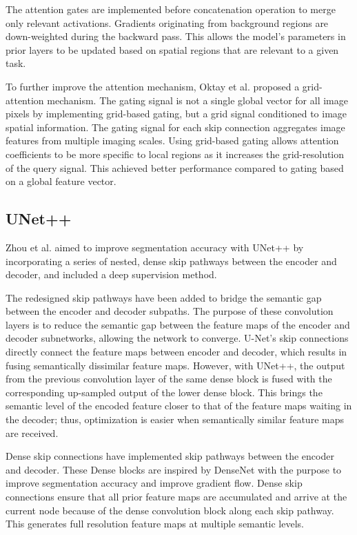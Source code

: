 \documentclass[conference]{IEEEtran}
\begin{document}
The attention gates are implemented before concatenation operation to merge only relevant activations. Gradients originating from background regions are down-weighted during the backward pass. This allows the model's parameters in prior layers to be updated based on spatial regions that are relevant to a given task.

To further improve the attention mechanism, Oktay et al. proposed a grid-attention mechanism. The gating signal is not a single global vector for all image pixels by implementing grid-based gating, but a grid signal conditioned to image spatial information. The gating signal for each skip connection aggregates image features from multiple imaging scales. Using grid-based gating allows attention coefficients to be more specific to local regions as it increases the grid-resolution of the query signal. This achieved better performance compared to gating based on a global feature vector.

\subsection{UNet++}

Zhou et al.\cite{zhou2018unet++} aimed to improve segmentation accuracy with UNet++ by incorporating a series of nested, dense skip pathways between the encoder and decoder, and included a deep supervision method.

The redesigned skip pathways have been added to bridge the semantic gap between the encoder and decoder subpaths. The purpose of these convolution layers is to reduce the semantic gap between the feature maps of the encoder and decoder subnetworks, allowing the network to converge. U-Net's skip connections directly connect the feature maps between encoder and decoder, which results in fusing semantically dissimilar feature maps. However, with UNet++, the output from the previous convolution layer of the same dense block is fused with the corresponding up-sampled output of the lower dense block. This brings the semantic level of the encoded feature closer to that of the feature maps waiting in the decoder; thus, optimization is easier when semantically similar feature maps are received.

Dense skip connections have implemented skip pathways between the encoder and decoder. These Dense blocks are inspired by DenseNet\cite{huang2017densely} with the purpose to improve segmentation accuracy and improve gradient flow. Dense skip connections ensure that all prior feature maps are accumulated and arrive at the current node because of the dense convolution block along each skip pathway. This generates full resolution feature maps at multiple semantic levels.
\end{document}
